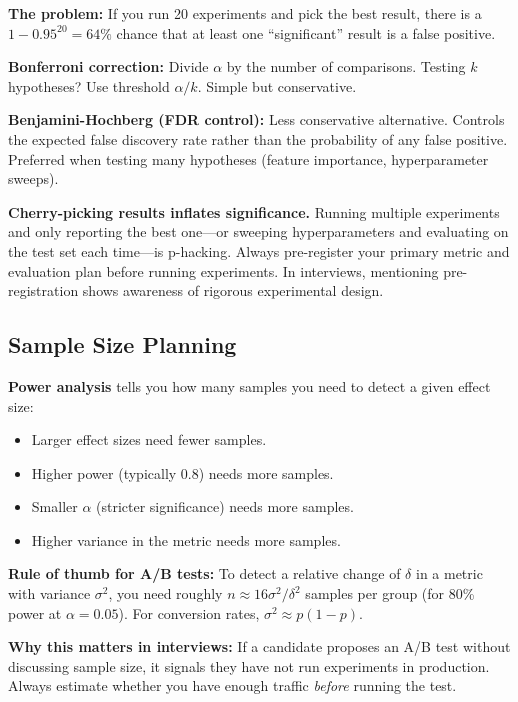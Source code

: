 \textbf{The problem:} If you run 20 experiments and pick the best result, there is a $1 - 0.95^{20} = 64\%$ chance that at least one ``significant'' result is a false positive.

\textbf{Bonferroni correction:} Divide $\alpha$ by the number of comparisons. Testing $k$ hypotheses? Use threshold $\alpha / k$. Simple but conservative.

\textbf{Benjamini-Hochberg (FDR control):} Less conservative alternative. Controls the expected false discovery rate rather than the probability of any false positive. Preferred when testing many hypotheses (feature importance, hyperparameter sweeps).

\begin{warningbox}
\textbf{Cherry-picking results inflates significance.} Running multiple experiments and only reporting the best one---or sweeping hyperparameters and evaluating on the test set each time---is p-hacking. Always pre-register your primary metric and evaluation plan before running experiments. In interviews, mentioning pre-registration shows awareness of rigorous experimental design.
\end{warningbox}

\subsection{Sample Size Planning}

\textbf{Power analysis} tells you how many samples you need to detect a given effect size:
\begin{itemize}
    \item Larger effect sizes need fewer samples.
    \item Higher power (typically 0.8) needs more samples.
    \item Smaller $\alpha$ (stricter significance) needs more samples.
    \item Higher variance in the metric needs more samples.
\end{itemize}

\textbf{Rule of thumb for A/B tests:} To detect a relative change of $\delta$ in a metric with variance $\sigma^2$, you need roughly $n \approx 16\sigma^2 / \delta^2$ samples per group (for 80\% power at $\alpha = 0.05$). For conversion rates, $\sigma^2 \approx p(1-p)$.

\textbf{Why this matters in interviews:} If a candidate proposes an A/B test without discussing sample size, it signals they have not run experiments in production. Always estimate whether you have enough traffic \textit{before} running the test.

